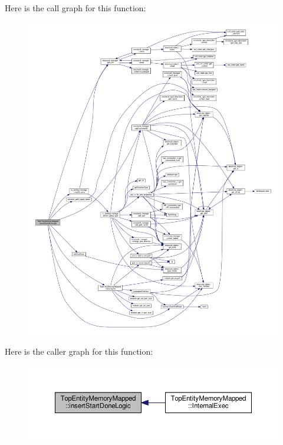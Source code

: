 Here is the call graph for this function\+:
\nopagebreak
\begin{figure}[H]
\begin{center}
\leavevmode
\includegraphics[width=350pt]{d1/db6/classTopEntityMemoryMapped_a4643e06f6203f9b1161ce578356eb6e5_cgraph}
\end{center}
\end{figure}
Here is the caller graph for this function\+:
\nopagebreak
\begin{figure}[H]
\begin{center}
\leavevmode
\includegraphics[width=350pt]{d1/db6/classTopEntityMemoryMapped_a4643e06f6203f9b1161ce578356eb6e5_icgraph}
\end{center}
\end{figure}
\mbox{\label{classTopEntityMemoryMapped_a78518a7d319f9fdc467a8fc74416268f}} 
